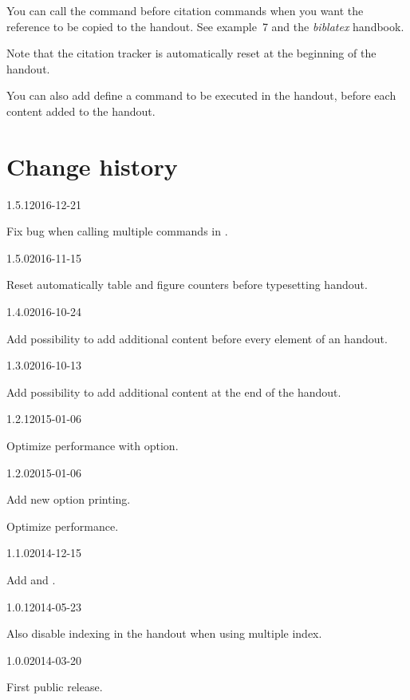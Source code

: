 \documentclass{ltxdockit}[2011/03/25]
\begin{document}
You can call the  command before citation commands when you want the reference to be copied to the handout. See example~7 and the \emph{biblatex} handbook.


Note that the citation tracker is automatically reset at the beginning of the handout.

You can also add define a  command to be executed in the handout, before each content added to the handout.
\section{Change history}

\begin{changelog}

\begin{release}{1.5.1}{2016-12-21}
\item Fix bug when calling multiple commands in .
\end{release}

\begin{release}{1.5.0}{2016-11-15}
\item Reset automatically table and figure counters before typesetting handout.
\end{release}

\begin{release}{1.4.0}{2016-10-24}
\item Add possibility to add additional content before every element of an handout.
\end{release}

\begin{release}{1.3.0}{2016-10-13}
\item Add possibility to add additional content at the end of the handout. 
\end{release}

\begin{release}{1.2.1}{2015-01-06}
\item Optimize performance with  option.
\end{release}

\begin{release}{1.2.0}{2015-01-06}
\item Add new option printing. 
\item Optimize performance.
\end{release}

\begin{release}{1.1.0}{2014-12-15}
\item Add  and . 
\end{release}

\begin{release}{1.0.1}{2014-05-23}
\item Also disable indexing in the handout when using multiple index.
\end{release}

\begin{release}{1.0.0}{2014-03-20}
\item First public release.
\end{release}
\end{changelog}
\end{document}
